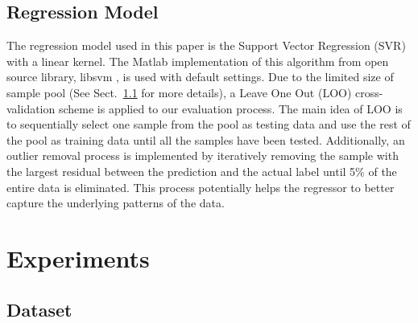 \documentclass{article}
\begin{document}
\subsection{Regression Model}
The regression model used in this paper is the Support Vector Regression (SVR) with a linear kernel. The Matlab implementation of this algorithm from open source library, libsvm \cite{Chang2011}, is used with default settings. Due to the limited size of sample pool (See Sect.~\ref{subsec:dataset} for more details), a Leave One Out (LOO) cross-validation scheme is applied to our evaluation process. The main idea of LOO is to sequentially select one sample from the pool as testing data and use the rest of the pool as training data until all the samples have been tested. Additionally, an outlier removal process is implemented by iteratively removing the sample with the largest residual between the prediction and the actual label until 5\% of the entire data is eliminated. This process potentially helps the regressor to better capture the underlying patterns of the data.  

\section{Experiments}\label{sec:experiments}
\subsection{Dataset}\label{subsec:dataset}
\end{document}
